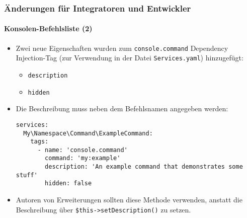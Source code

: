 %

\begin{frame}[fragile]
	\frametitle{Änderungen für Integratoren und Entwickler}
	\framesubtitle{Konsolen-Befehlsliste (2)}


	\begin{itemize}
		\item Zwei neue Eigenschaften wurden zum \texttt{console.command}
			Dependency Injection-Tag (zur Verwendung in der Datei \texttt{Services.yaml}) hinzugefügt:
			\begin{itemize}
				\item \texttt{description}
				\item \texttt{hidden}
			\end{itemize}
			\vspace{0.2cm}
		\item Die Beschreibung muss neben dem Befehlsnamen angegeben werden:
\begin{lstlisting}
services:
  My\Namespace\Command\ExampleCommand:
    tags:
      - name: 'console.command'
        command: 'my:example'
        description: 'An example command that demonstrates some stuff'
        hidden: false
\end{lstlisting}

		\item Autoren von Erweiterungen sollten diese Methode verwenden,
			anstatt die Beschreibung über \texttt{\$this->setDescription()} zu setzen.

	\end{itemize}

\end{frame}

